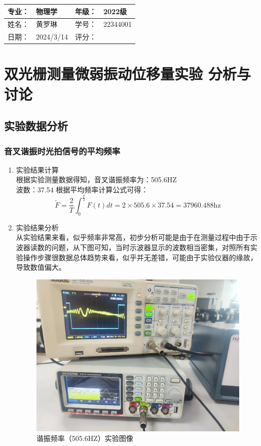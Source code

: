\documentclass[dvipsnames, svgnames,a4paper,11pt]{article}
\begin{document}
	\begin{table}
		\renewcommand\arraystretch{1.7}
		\begin{tabularx}{\textwidth}{|X|X|X|X|}
			\hline
			专业：& 物理学 &年级：& 2022级\\
			\hline
			姓名： & 黄罗琳 & 学号：& 22344001\\
			\hline
			日期：& 2024/3/14 & 评分： &\\
			\hline
		\end{tabularx}
	\end{table}
	
	\section{双光栅测量微弱振动位移量实验 \quad\heiti  分析与讨论}
	
	\subsection{实验数据分析}
	
	\subsubsection{音叉谐振时光拍信号的平均频率}
	\begin{enumerate}
		\item 实验结果计算\\
		根据实验测量数据得知，音叉谐振频率为：505.6HZ\\
		波数：37.54
	    根据平均频率计算公式可得：
	  $$\tilde{F}=\frac{2}{T}\int_{0}^{\frac{T}{2}}F(t)dt=2\times505.6\times37.54=37960.488\text{hz}$$
	  \item 实验结果分析\\
	  从实验结果来看，似乎频率非常高，初步分析可能是由于在测量过程中由于示波器读数的问题，从下图可知，当时示波器显示的波数相当密集，对照所有实验操作步骤很数据总体趋势来看，似乎并无差错，可能由于实验仪器的缘故，导致数值偏大。

	  \begin{figure}[H]
		\centering
		\includegraphics[width=0.4\linewidth]{images/505.6}
		\caption{谐振频率（505.6HZ）实验图像}
		\label{505.6}
	\end{figure}
	  
	\end{enumerate}
	
\end{document}
